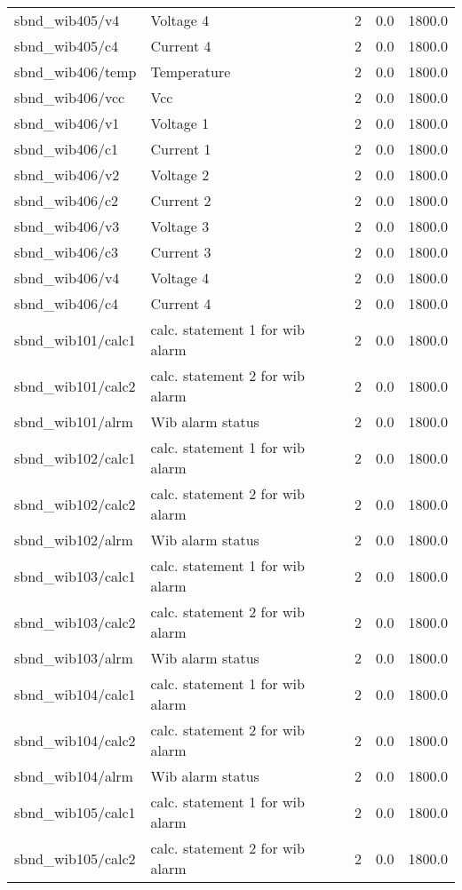 \begin{center}
\begin{longtable}{l | l l l l }
sbnd\_wib405/v4 & Voltage 4 & 2 & 0.0 & 1800.0\\ 
sbnd\_wib405/c4 & Current 4 & 2 & 0.0 & 1800.0\\ 
sbnd\_wib406/temp & Temperature & 2 & 0.0 & 1800.0\\ 
sbnd\_wib406/vcc & Vcc & 2 & 0.0 & 1800.0\\ 
sbnd\_wib406/v1 & Voltage 1 & 2 & 0.0 & 1800.0\\ 
sbnd\_wib406/c1 & Current 1 & 2 & 0.0 & 1800.0\\ 
sbnd\_wib406/v2 & Voltage 2 & 2 & 0.0 & 1800.0\\ 
sbnd\_wib406/c2 & Current 2 & 2 & 0.0 & 1800.0\\ 
sbnd\_wib406/v3 & Voltage 3 & 2 & 0.0 & 1800.0\\ 
sbnd\_wib406/c3 & Current 3 & 2 & 0.0 & 1800.0\\ 
sbnd\_wib406/v4 & Voltage 4 & 2 & 0.0 & 1800.0\\ 
sbnd\_wib406/c4 & Current 4 & 2 & 0.0 & 1800.0\\ 
sbnd\_wib101/calc1 & calc. statement 1 for wib alarm & 2 & 0.0 & 1800.0\\ 
sbnd\_wib101/calc2 & calc. statement 2 for wib alarm & 2 & 0.0 & 1800.0\\ 
sbnd\_wib101/alrm & Wib alarm status & 2 & 0.0 & 1800.0\\ 
sbnd\_wib102/calc1 & calc. statement 1 for wib alarm & 2 & 0.0 & 1800.0\\ 
sbnd\_wib102/calc2 & calc. statement 2 for wib alarm & 2 & 0.0 & 1800.0\\ 
sbnd\_wib102/alrm & Wib alarm status & 2 & 0.0 & 1800.0\\ 
sbnd\_wib103/calc1 & calc. statement 1 for wib alarm & 2 & 0.0 & 1800.0\\ 
sbnd\_wib103/calc2 & calc. statement 2 for wib alarm & 2 & 0.0 & 1800.0\\ 
sbnd\_wib103/alrm & Wib alarm status & 2 & 0.0 & 1800.0\\ 
sbnd\_wib104/calc1 & calc. statement 1 for wib alarm & 2 & 0.0 & 1800.0\\ 
sbnd\_wib104/calc2 & calc. statement 2 for wib alarm & 2 & 0.0 & 1800.0\\ 
sbnd\_wib104/alrm & Wib alarm status & 2 & 0.0 & 1800.0\\ 
sbnd\_wib105/calc1 & calc. statement 1 for wib alarm & 2 & 0.0 & 1800.0\\ 
sbnd\_wib105/calc2 & calc. statement 2 for wib alarm & 2 & 0.0 & 1800.0\\ 

\end{longtable}
\end{center}
